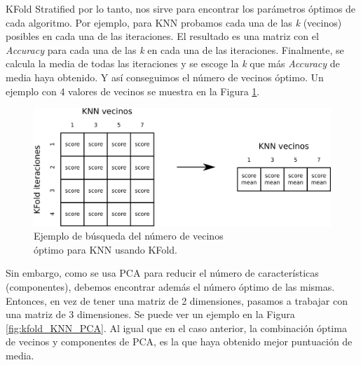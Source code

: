 KFold Stratified por lo tanto, nos sirve para encontrar los parámetros óptimos de cada algoritmo. Por ejemplo, para KNN probamos cada una de las \textit{k} (vecinos) posibles en cada una de las iteraciones. El resultado es una matriz con el \textit{Accuracy} para cada una de las \textit{k} en cada una de las iteraciones. Finalmente, se calcula la media de todas las iteraciones y se escoge la \textit{k} que más \textit{Accuracy} de media haya obtenido. Y así conseguimos el número de vecinos óptimo. Un ejemplo con 4 valores de vecinos se muestra en la Figura \ref{fig:kfold_KNN}.\\

\begin{figure} [h!]
  \begin{center}
    \includegraphics[width=13cm]{figs/KFold_KNN.png}
  \end{center}
  \captionsetup{justification=centering}
  \caption{Ejemplo de búsqueda del número de vecinos\\
  óptimo para KNN usando KFold.}
  \label{fig:kfold_KNN}
\end{figure}

Sin embargo, como se usa PCA para reducir el número de características (componentes), debemos encontrar además el número óptimo de las mismas. Entonces, en vez de tener una matriz de 2 dimensiones, pasamos a trabajar con una matriz de 3 dimensiones. Se puede ver un ejemplo en la Figura \ref{fig:kfold_KNN_PCA}. Al igual que en el caso anterior, la combinación óptima de vecinos y componentes de PCA, es la que haya obtenido mejor puntuación de media.\\

